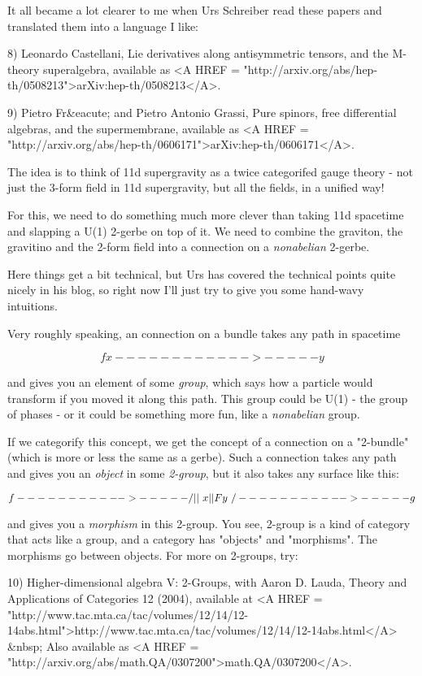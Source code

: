 It all became a lot clearer to me when Urs Schreiber read 
these papers and translated them into a language I like:

8) Leonardo Castellani, Lie derivatives along antisymmetric 
tensors, and the M-theory superalgebra, available as <A HREF = "http://arxiv.org/abs/hep-th/0508213">arXiv:hep-th/0508213</A>.

9) Pietro Fr&eacute; and Pietro Antonio Grassi, Pure spinors, 
free differential algebras, and the supermembrane, available
as <A HREF = "http://arxiv.org/abs/hep-th/0606171">arXiv:hep-th/0606171</A>.

The idea is to think of 11d supergravity as a twice categorifed
gauge theory - not just the 3-form field in 11d supergravity,
but all the fields, in a unified way!  

For this, we need to do something much more clever than taking
11d spacetime and slapping a U(1) 2-gerbe on top of it.  We 
need to combine the graviton, the gravitino and the 2-form field 
into a connection on a \emph{nonabelian} 2-gerbe.  

Here things get a bit technical, but Urs has covered the technical
points quite nicely in his blog, so right now I'll just try to
give you some hand-wavy intuitions.

Very roughly speaking, an connection on a bundle takes any path 
in spacetime

$$
             f
  x------------>-----y    
$$
    
and gives you an element of some \emph{group}, which says how a particle
would transform if you moved it along this path.  This group could
be U(1) - the group of phases - or it could be something more fun,
like a \emph{nonabelian} group.  

If we categorify this concept, we get the concept of a connection
on a "2-bundle" (which is more or less the same as a gerbe).  Such
a connection takes any path and gives you an \emph{object} in some 
\emph{2-group}, 
but it also takes any surface like this:

$$
              f
    ----------->-----
   /        ||       \
  x         ||F       y  
   \        \/       /  
    ----------->-----
               g
$$
    
and gives you a \emph{morphism} in this 2-group.  You see, 2-group
is a kind of category that acts like a group, and a category 
has "objects" and "morphisms".  The morphisms go between objects.  
For more on 2-groups, try:

10) Higher-dimensional algebra V: 2-Groups, with Aaron D. Lauda, 
Theory and Applications of Categories 12 (2004), available at
<A HREF = "http://www.tac.mta.ca/tac/volumes/12/14/12-14abs.html">http://www.tac.mta.ca/tac/volumes/12/14/12-14abs.html</A> &nbsp;
Also available as <A HREF = "http://arxiv.org/abs/math.QA/0307200">math.QA/0307200</A>.

